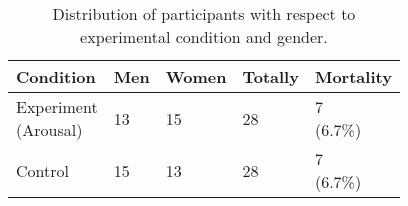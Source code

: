 


\begin{table*}
  \centering
  \begin{tabularx}{0.8\textwidth}{XXXXX}
    \toprule
    Condition & Men & Women & Totally & Mortality \\ 
    \midrule
    \cellcontent{Experiment\\(Arousal)} & 13 & 15 & 28
    & \cellcontent{7\\(6.7\%)} \\
    Control & 15 & 13 & 28
    & \cellcontent{7\\(6.7\%)} \\
    \bottomrule
  \end{tabularx}
  \caption{Distribution of participants with respect to experimental
    condition and gender.}
  \label{table:participants}
\end{table*}









